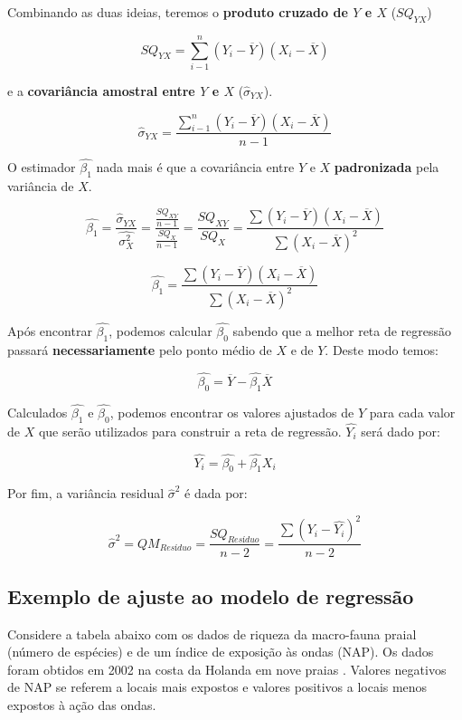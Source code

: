 \documentclass[
]{book}
\begin{document}
Combinando as duas ideias, teremos o \textbf{produto cruzado de \(Y\) e \(X\)} (\(SQ_{YX}\))

\[SQ_{YX} = \sum_{i-1}^{n}(Y_i - \overline{Y}) (X_i - \overline{X})\]

e a \textbf{covariância amostral entre \(Y\) e \(X\)} (\(\hat{\sigma}_{YX}\)).

\[\hat{\sigma}_{YX} = \frac{\sum_{i-1}^{n}(Y_i - \overline{Y}) (X_i - \overline{X})}{n-1}\]

O estimador \(\hat{\beta_1}\) nada mais é que a covariância entre \(Y\) e \(X\) \textbf{padronizada} pela variância de \(X\).

\[\hat{\beta_1} = \frac{\hat{\sigma}_{YX}}{\hat{\sigma^2_X}} = \frac{\frac{SQ_{XY}}{n-1}}{\frac{SQ_X}{n-1}} = \frac{SQ_{XY}}{SQ_X} = \frac{\sum{(Y_i - \overline{Y})(X_i - \overline{X})}}{\sum{(X_i - \overline{X})^2}}\]

\[\hat{\beta_1} = \frac{\sum{(Y_i - \overline{Y})(X_i - \overline{X})}}{\sum{(X_i - \overline{X})^2}}\]

Após encontrar \(\hat{\beta_1}\), podemos calcular \(\hat{\beta_0}\) sabendo que a melhor reta de regressão passará \textbf{necessariamente} pelo ponto médio de \(X\) e de \(Y\). Deste modo temos:

\[\hat{\beta_0} = \overline{Y} - \hat{\beta_1}\overline{X}\]

Calculados \(\hat{\beta_1}\) e \(\hat{\beta_0}\), podemos encontrar os valores ajustados de \(Y\) para cada valor de \(X\) que serão utilizados para construir a reta de regressão. \(\hat{Y_i}\) será dado por:

\[\hat{Y_i} = \hat{\beta_0} + \hat{\beta_1}X_i\]

Por fim, a variância residual \(\hat{\sigma}^2\) é dada por:

\[\hat{\sigma}^2 = QM_{Resíduo} = \frac{SQ_{Resíduo}}{n-2} = \frac{\sum{(Y_i-\hat{Y_ i})^2}}{n-2}\]

\hypertarget{exemplo-de-ajuste-ao-modelo-de-regressuxe3o}{%
\subsection{Exemplo de ajuste ao modelo de regressão}\label{exemplo-de-ajuste-ao-modelo-de-regressuxe3o}}

Considere a tabela abaixo com os dados de riqueza da macro-fauna praial (número de espécies) e de um índice de exposição às ondas (NAP). Os dados foram obtidos em 2002 na costa da Holanda em nove praias \citep{zuur2009mixed}. Valores negativos de NAP se referem a locais mais expostos e valores positivos a locais menos expostos à ação das ondas.
\end{document}
